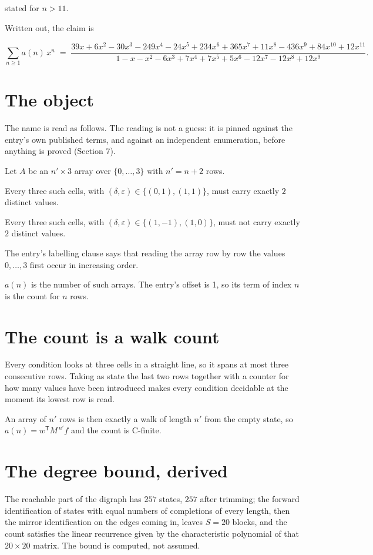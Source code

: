\documentclass[11pt]{article}
\theoremstyle{definition}
\begin{document}
stated for $n > 11$.

Written out, the claim is

\[\sum_{n \ge 1} a(n)\,x^n \;=\; \frac{39x + 6x^{2} - 30x^{3} - 249x^{4} - 24x^{5} + 234x^{6} + 365x^{7} + 11x^{8} - 436x^{9} + 84x^{10} + 12x^{11}}{1 - x - x^{2} - 6x^{3} + 7x^{4} + 7x^{5} + 5x^{6} - 12x^{7} - 12x^{8} + 12x^{9}}.\]

\section{The object}

The name is read as follows. The reading is not a guess: it is pinned against the entry's own published terms, and against an independent enumeration, before anything is proved (Section 7).

Let $A$ be an $n' \times 3$ array over $\{0,\dots,3\}$ with $n' = n + 2$ rows.

Every three such cells, with $(\delta,\varepsilon) \in \{(0,1), (1,1)\}$, must carry exactly $2$ distinct values.

Every three such cells, with $(\delta,\varepsilon) \in \{(1,-1), (1,0)\}$, must not carry exactly $2$ distinct values.

The entry's labelling clause says that reading the array row by row the values $0,\dots,3$ first occur in increasing order.

$a(n)$ is the number of such arrays. The entry's offset is 1, so its term of index $n$ is the count for $n$ rows.

\section{The count is a walk count}

Every condition looks at three cells in a straight line, so it spans at most three consecutive rows. Taking as state the last two rows together with a counter for how many values have been introduced makes every condition decidable at the moment its lowest row is read.

An array of $n'$ rows is then exactly a walk of length $n'$ from the empty state, so $a(n) = w^{\mathsf T}M^{\,n'}f$ and the count is C-finite.

\section{The degree bound, derived}

The reachable part of the digraph has $257$ states, $257$ after trimming; the forward identification of states with equal numbers of completions of every length, then the mirror identification on the edges coming in, leaves $S = 20$ blocks, and the count satisfies the linear recurrence given by the characteristic polynomial of that $20\times20$ matrix. The bound is computed, not assumed.
\end{document}
